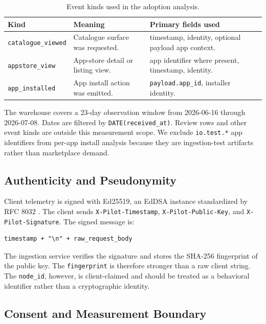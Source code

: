 \documentclass[10pt,twocolumn]{article}
\newcommand{\app}[1]{\texttt{#1}}
\begin{document}
\begin{table}[!t]
\centering
\caption{Event kinds used in the adoption analysis.}
\label{tab:event-kinds}
\begin{tabularx}{\textwidth}{@{}p{}Y Y@{}}
\toprule
\textbf{Kind} & \textbf{Meaning} & \textbf{Primary fields used} \\
\midrule
\texttt{catalogue\_viewed} & Catalogue surface was requested. & timestamp, identity, optional payload app context. \\
\texttt{appstore\_view} & App-store detail or listing view. & app identifier where present, timestamp, identity. \\
\texttt{app\_installed} & App install action was emitted. & \texttt{payload.app\_id}, installer identity. \\
\bottomrule
\end{tabularx}
\end{table}

The warehouse covers a 23-day observation window from 2026-06-16 through 2026-07-08. Dates are filtered by \texttt{DATE(received\_at)}. Review rows and other event kinds are outside this measurement scope. We exclude \app{io.test.*} app identifiers from per-app install analysis because they are ingestion-test artifacts rather than marketplace demand.

\subsection{Authenticity and Pseudonymity}

Client telemetry is signed with Ed25519, an EdDSA instance standardized by RFC 8032 \cite{rfc8032}. The client sends \texttt{X-Pilot-Timestamp}, \texttt{X-Pilot-Public-Key}, and \texttt{X-Pilot-Signature}. The signed message is:

\begin{lstlisting}
timestamp + "\n" + raw_request_body
\end{lstlisting}

The ingestion service verifies the signature and stores the SHA-256 fingerprint of the public key. The \texttt{fingerprint} is therefore stronger than a raw client string. The \texttt{node\_id}, however, is client-claimed and should be treated as a behavioral identifier rather than a cryptographic identity.

\subsection{Consent and Measurement Boundary}
\end{document}

